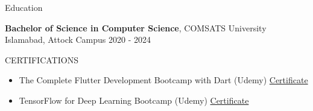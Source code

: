 \documentclass{resume}
\begin{document}
\begin{rSection}{Education}

{\bf Bachelor of Science in Computer Science}, COMSATS University Islamabad, Attock Campus \hfill {2020 - 2024}

\end{rSection}

 

\begin{rSection}{CERTIFICATIONS} 
\begin{itemize}
    \item The Complete Flutter Development Bootcamp with Dart (Udemy) \href{https://www.udemy.com/certificate/UC-ba57466f-1eaa-48cf-b8c6-621285b2e9c3/}{Certificate}
    \item TensorFlow for Deep Learning Bootcamp (Udemy) \href{https://www.udemy.com/certificate/UC-1cb41d5b-3620-41a2-aa82-33cb4ffe18a7/}{Certificate}
\end{itemize}

\end{rSection}
\end{document}
